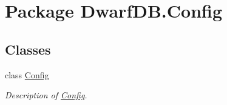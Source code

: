 \hypertarget{namespace_dwarf_d_b_1_1_config}{\section{Package Dwarf\+D\+B.\+Config}
\label{namespace_dwarf_d_b_1_1_config}
}
\subsection*{Classes}
\begin{DoxyCompactItemize}
\item 
class \hyperlink{class_dwarf_d_b_1_1_config_1_1_config}{Config}
\begin{DoxyCompactList}\small\item\em Description of \hyperlink{class_dwarf_d_b_1_1_config_1_1_config}{Config}. \end{DoxyCompactList}\end{DoxyCompactItemize}
